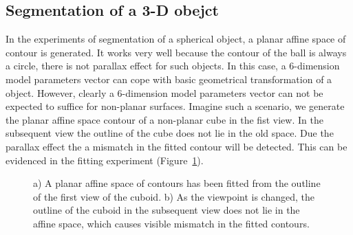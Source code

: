 \subsection{Segmentation of a 3-D obejct}
\label{sec:s3o}
In the experiments of segmentation of a spherical object, a planar
affine space of contour is generated. It works very well because the
contour of the ball is always a circle, there is not parallax effect
for such objects. In this case, a 6-dimension model parameters vector
can cope with basic geometrical transformation of a object. However,
clearly a 6-dimension model parameters vector can not be expected to
suffice for non-planar surfaces. Imagine such a scenario, we generate the  planar affine
space contour of a non-planar cube in the fist view. In the
subsequent view the outline of the cube does not lie in the old
space. Due the parallax effect the a mismatch in the fitted contour
will be detected. This can be evidenced in the fitting experiment (Figure~\ref{fig:box_mismatch}).
\begin{figure}[htbp]
  \begin{minipage}[t]{0.5\linewidth} 
    \centering 
  \end{minipage}%
  \begin{minipage}[t]{0.5\linewidth} 
    \centering 
  \end{minipage} 
  \caption[Planar space can not encompass a general non-planar
  contour]{a) A planar affine space of contours has been fitted from
    the outline of the first view of the cuboid. b) As the viewpoint
    is changed, the outline of the cuboid in the subsequent view does
    not lie in the affine space, which causes visible mismatch in the
    fitted contours.}
\label{fig:box_mismatch}
\end{figure}


